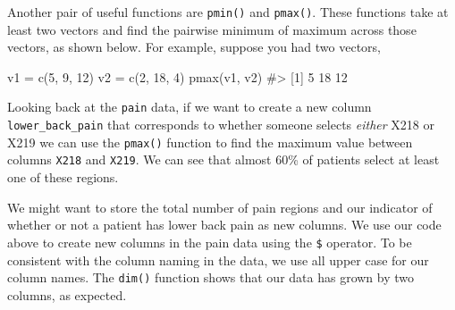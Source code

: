 \documentclass[
  letterpaper,
]{krantz}
\makeatletter
\newenvironment{Shaded}{\begin{snugshade}}{\end{snugshade}}
\newcommand{\CommentTok}[1]{\textcolor[rgb]{0.37,0.37,0.37}{#1}}
\newcommand{\DecValTok}[1]{\textcolor[rgb]{0.68,0.00,0.00}{#1}}
\newcommand{\FunctionTok}[1]{\textcolor[rgb]{0.28,0.35,0.67}{#1}}
\newcommand{\NormalTok}[1]{\textcolor[rgb]{0.00,0.23,0.31}{#1}}
\newcommand{\OtherTok}[1]{\textcolor[rgb]{0.00,0.23,0.31}{#1}}
\newcommand{\SpecialCharTok}[1]{\textcolor[rgb]{0.37,0.37,0.37}{#1}}
\newenvironment{kframe}{%
\medskip{}
\setlength{\fboxsep}{.8em}
 \def\at@end@of@kframe{}%
 \ifinner\ifhmode%
  \def\at@end@of@kframe{\end{minipage}}%
  \begin{minipage}{\columnwidth}%
 \fi\fi%
 \def\FrameCommand##1{\hskip\@totalleftmargin \hskip-\fboxsep
 \colorbox{shadecolor}{##1}\hskip-\fboxsep
     \hskip-\linewidth \hskip-\@totalleftmargin \hskip\columnwidth}%
 \MakeFramed {\advance\hsize-\width
   \@totalleftmargin\z@ \linewidth\hsize
   \@setminipage}}%
 {\par\unskip\endMakeFramed%
 \at@end@of@kframe}
\renewenvironment{Shaded}{\begin{kframe}}{\end{kframe}}
\makeatother
\begin{document}
Another pair of useful functions are \texttt{pmin()} and
\texttt{pmax()}. These functions take at least two vectors and find the
pairwise minimum of maximum across those vectors, as shown below. For
example, suppose you had two vectors,

\begin{Shaded}
\begin{Highlighting}[]
\NormalTok{v1 }\OtherTok{=} \FunctionTok{c}\NormalTok{(}\DecValTok{5}\NormalTok{, }\DecValTok{9}\NormalTok{, }\DecValTok{12}\NormalTok{)}
\NormalTok{v2 }\OtherTok{=} \FunctionTok{c}\NormalTok{(}\DecValTok{2}\NormalTok{, }\DecValTok{18}\NormalTok{, }\DecValTok{4}\NormalTok{)}
\FunctionTok{pmax}\NormalTok{(v1, v2)  }
\CommentTok{\#\textgreater{} [1]  5 18 12}
\end{Highlighting}
\end{Shaded}

Looking back at the \texttt{pain} data, if we want to create a new
column \texttt{lower\_back\_pain} that corresponds to whether someone
selects \emph{either} X218 or X219 we can use the \texttt{pmax()}
function to find the maximum value between columns \texttt{X218} and
\texttt{X219}. We can see that almost 60\% of patients select at least
one of these regions.

\begin{Shaded}
\end{Shaded}

We might want to store the total number of pain regions and our
indicator of whether or not a patient has lower back pain as new
columns. We use our code above to create new columns in the pain data
using the \texttt{\$} operator. To be consistent with the column naming
in the data, we use all upper case for our column names. The
\texttt{dim()} function shows that our data has grown by two columns, as
expected.

\begin{Shaded}
\end{Shaded}
\end{document}
